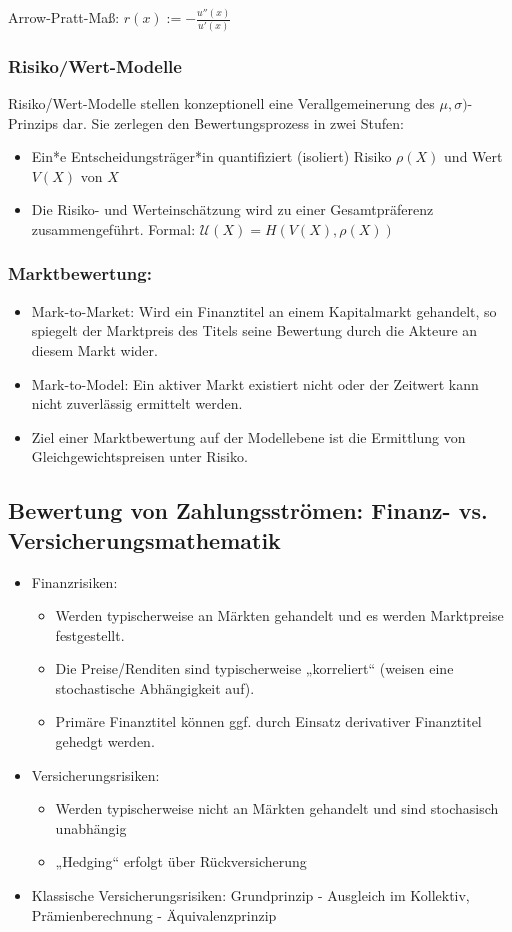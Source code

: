 \documentclass[12pt]{report}
\theoremstyle{dotless}
\theoremstyle{definition}
\begin{document}
Arrow-Pratt-Maß: $r(x) := -\frac{u''(x)}{u'(x)}$

\subsubsection{Risiko/Wert-Modelle}

Risiko/Wert-Modelle stellen konzeptionell eine Verallgemeinerung des
$\mu, \sigma)$-Prinzips dar. Sie zerlegen den Bewertungsprozess in zwei Stufen:
\begin{itemize}
\item Ein*e Entscheidungsträger*in quantifiziert (isoliert) Risiko $\rho (X)$ und
Wert $V(X)$ von $X$
\item Die Risiko- und Werteinschätzung wird zu einer Gesamtpräferenz
zusammengeführt. Formal: $\mathcal{U}(X) = H(V(X), \rho(X))$
\end{itemize}


\subsubsection{Marktbewertung:}
\begin{itemize}
\item Mark-to-Market: Wird ein Finanztitel an einem Kapitalmarkt gehandelt, so spiegelt der Marktpreis des Titels seine Bewertung durch die Akteure an diesem Markt wider.
\item Mark-to-Model: Ein aktiver Markt existiert nicht oder der Zeitwert kann nicht zuverlässig
ermittelt werden.
\item Ziel einer Marktbewertung auf der Modellebene ist die Ermittlung von
Gleichgewichtspreisen unter Risiko.
\end{itemize}

\subsection{Bewertung von Zahlungsströmen: Finanz- vs. Versicherungsmathematik}
\begin{itemize}
\item Finanzrisiken:
\begin{itemize}
\item Werden typischerweise an Märkten gehandelt und es werden Marktpreise
festgestellt.
\item Die Preise/Renditen sind typischerweise „korreliert“ (weisen eine stochastische
Abhängigkeit auf).
\item Primäre Finanztitel können ggf. durch Einsatz derivativer Finanztitel gehedgt
werden.
\end{itemize}
\item Versicherungsrisiken:
\begin{itemize}
\item Werden typischerweise nicht an Märkten gehandelt und sind stochasisch unabhängig
\item „Hedging“ erfolgt über Rückversicherung
\end{itemize}
\item Klassische Versicherungsrisiken: Grundprinzip - Ausgleich im Kollektiv, Prämienberechnung - Äquivalenzprinzip
\end{itemize}
\end{document}
